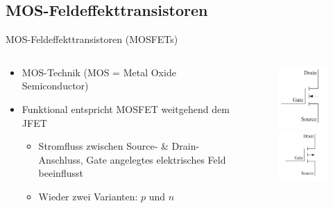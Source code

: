 \documentclass[12pt%
,aspectratio=169%
]{beamer}
\begin{document}
\subsection{MOS-Feldeffekttransistoren}
\begin{frame}{MOS-Feldeffekttransistoren (MOSFETs)}
\begin{columns}[T] %
\begin{column}{.58\textwidth}
	\begin{itemize}
		\item MOS-Technik (MOS = Metal Oxide Semiconductor)
		\item Funktional entspricht MOSFET weitgehend dem JFET
		\begin{itemize}
			\item Stromfluss zwischen Source- \& Drain-Anschluss, Gate angelegtes elektrisches Feld beeinflusst
			\item Wieder zwei Varianten: $p$ und $n$		
		\end{itemize}
	\end{itemize}
\end{column}%
\hfill%
\begin{column}{.38\textwidth}
\begin{figure}
\center
\includegraphics[scale=0.4]{pictures/n_mosfet}\\
\includegraphics[scale=0.4]{pictures/p_mosfet}
\end{figure}
\end{column}%
\end{columns}
\end{frame}
\end{document}
